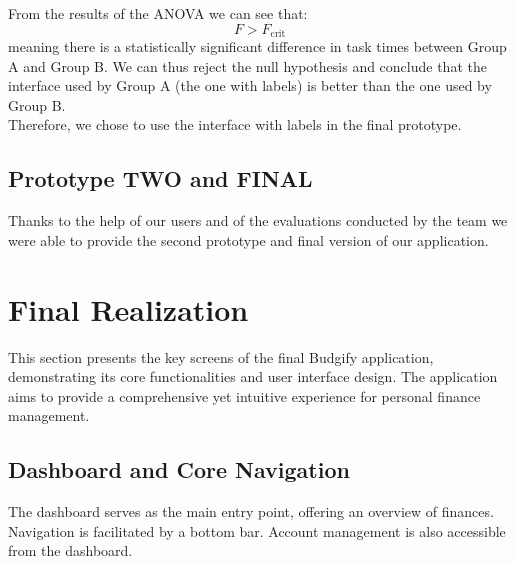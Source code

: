 \documentclass[a4paper,12pt]{article}
\begin{document}
From the results of the ANOVA we can see that:\\
\[
F > F_{\text{crit}}
\]
meaning there is a statistically significant difference in task times between Group A and Group B. We can thus reject the null hypothesis and conclude that the interface used by Group A (the one with labels) is better than the one used by Group B.\\
Therefore, we chose to use the interface with labels in the final prototype.

\subsection{Prototype TWO and FINAL}
Thanks to the help of our users and of the evaluations conducted by the team we were able to provide the second prototype and final version of our application.


\section{Final Realization}
\label{sec:final_realization}
This section presents the key screens of the final Budgify application, demonstrating its core functionalities and user interface design. The application aims to provide a comprehensive yet intuitive experience for personal finance management.

\subsection{Dashboard and Core Navigation}
The dashboard serves as the main entry point, offering an overview of finances. Navigation is facilitated by a bottom bar. Account management is also accessible from the dashboard.
\end{document}
